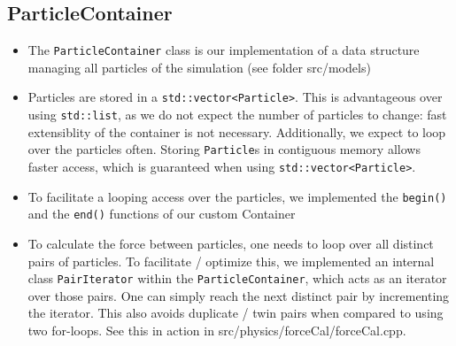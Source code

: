\documentclass{article}
\begin{document}
\subsection{ParticleContainer}
\label{sec:Refactoring:ParticleContainer}
\begin{itemize}
    \item The \verb|ParticleContainer| class is our implementation of a data structure managing all particles of the simulation (see folder src/models)
    \item Particles are stored in a \verb|std::vector<Particle>|. This is advantageous over using \verb|std::list|, as we do not expect the number of particles to change: fast extensiblity of the container is not necessary. Additionally, we expect to loop over the particles often. Storing \verb|Particle|s in contiguous memory allows faster access, which is guaranteed when using \verb|std::vector<Particle>|.
    \item To facilitate a looping access over the particles, we implemented the \verb|begin()| and the \verb|end()| functions of our custom Container
    \item To calculate the force between particles, one needs to loop over all distinct pairs of particles. To facilitate / optimize this, we implemented an internal class \verb|PairIterator| within the \verb|ParticleContainer|, which acts as an iterator over those pairs. One can simply reach the next distinct pair by incrementing the iterator. This also avoids duplicate / twin pairs when compared to using two for-loops. See this in action in src/physics/forceCal/forceCal.cpp.
\end{itemize}
\end{document}
